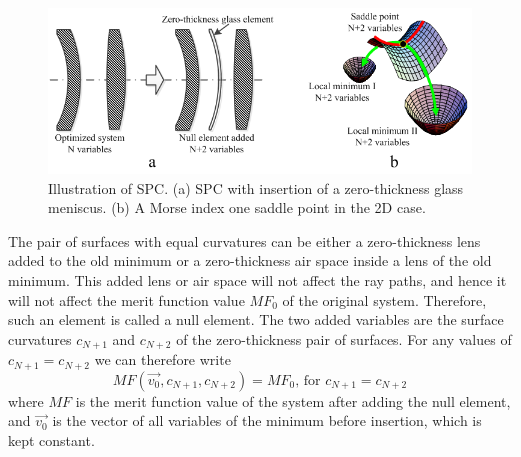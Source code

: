\begin{figure}[h!]
    \centering
    \includegraphics[scale=0.68]{chapter-2-sp/figures/FigSPCDemo.png}
    \caption{Illustration of SPC. (a) SPC with insertion of a zero-thickness glass meniscus. (b) A Morse index one saddle point in the 2D case.}
    \label{fig:SPCdemo}
\end{figure}

The pair of surfaces with equal curvatures can be either a zero-thickness lens added to the old minimum or a zero-thickness air space inside a lens of the old minimum. This added lens or air space will not affect the ray paths, and hence it will not affect the merit function value $MF_0$ of the original system. Therefore, such an element is called a null element. The two added variables are the surface curvatures $c_{N+1}$ and $c_{N+2}$ of the zero-thickness pair of surfaces. For any values of $c_{N+1} = c_{N+2}$ we can therefore write
\begin{equation} \label{eq:1}
    MF(\vec{v_0},c_{N+1},c_{N+2}) = MF_0 \textrm{, for } c_{N+1}=c_{N+2} 
\end{equation} 
where $MF$ is the merit function value of the system after adding the null element, and $\vec{v_0}$ is the vector of all variables of the minimum before insertion, which is kept constant.


